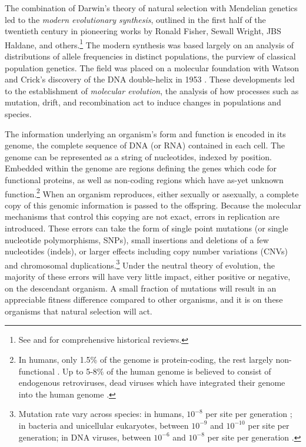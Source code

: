 The combination of Darwin's theory of natural selection with Mendelian genetics led to the \emph{modern evolutionary synthesis}, outlined in the first half of the twentieth century in pioneering works by Ronald Fisher, Sewall Wright, JBS Haldane, and others.\footnote{See \cite{Huxley:1942} and \cite{Gould:2002ts} for comprehensive historical reviews.}
The modern synthesis was based largely on an analysis of distributions of allele frequencies in distinct populations, the purview of classical population genetics.
The field was placed on a molecular foundation with Watson and Crick's discovery of the DNA double-helix in 1953 \cite{Watson:1953wm}.
These developments led to the establishment of \emph{molecular evolution}, the analysis of how processes such as mutation, drift, and recombination act to induce changes in populations and species.

The information underlying an organism's form and function is encoded in its genome, the complete sequence of DNA (or RNA) contained in each cell.
The genome can be represented as a string of nucleotides, indexed by position.
Embedded within the genome are regions defining the genes which code for functional proteins, as well as non-coding regions which have as-yet unknown function.\footnote{In humans, only 1.5\% of the genome is protein-coding, the rest largely non-functional \cite{Lander:2001hk}. Up to 5-8\% of the human genome is believed to consist of endogenous retroviruses, dead viruses which have integrated their genome into the human genome \cite{Belshaw:2004gw}.}
When an organism reproduces, either sexually or asexually, a complete copy of this genomic information is passed to the offspring.
Because the molecular mechanisms that control this copying are not exact, errors in replication are introduced.
These errors can take the form of single point mutations (or single nucleotide polymorphisms, SNPs), small insertions and deletions of a few nucleotides (indels), or larger effects including copy number variations (CNVs) and chromosomal duplications.\footnote{Mutation rate vary across species: in humans, $10^{-8}$ per site per generation \cite{Nachman:2000um}; in bacteria and unicellular eukaryotes, between $10^{-9}$ and $10^{-10}$ per site per generation; in DNA viruses, between $10^{-6}$ and $10^{-8}$ per site per generation \cite{Drake:1998kv}.}
Under the neutral theory of evolution, the majority of these errors will have very little impact, either positive or negative, on the descendant organism.
A small fraction of mutations will result in an appreciable fitness difference compared to other organisms, and it is on these organisms that natural selection will act.

